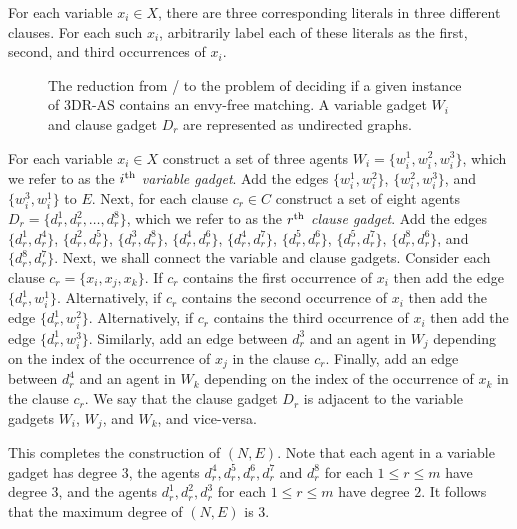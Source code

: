 For each variable $x_i \in X$, there are three corresponding literals in three different clauses. For each such $x_i$, arbitrarily label each of these literals as the first, second, and third occurrences of $x_i$.
\begin{figure}
    \centering
    
    \caption[The reduction from \porschenxsatvariant/ to the problem of deciding if a given instance of 3DR-AS contains an envy-free matching]{The reduction from \porschenxsatvariant/ to the problem of deciding if a given instance of 3DR-AS contains an envy-free matching. A variable gadget $W_i$ and clause gadget $D_r$ are represented as undirected graphs.}
    \label{fig:threed_efr_as_regular_envy_free_reduction}
\end{figure}
For each variable $x_i \in X$ construct a set of three agents $W_i = \{ w_i^1, w_i^2, w_i^3 \}$, which we refer to as the \emph{$i\textsuperscript{th}$ variable gadget}. Add the edges $\{ w_i^1, w_i^2 \}$, $\{ w_i^2, w_i^3 \}$, and $\{ w_i^3, w_i^1 \}$ to $E$. Next, for each clause $c_r\in C$ construct a set of eight agents $D_r = \{ d_r^1, d_r^2, \dots, d_r^8 \}$, which we refer to as the \emph{$r\textsuperscript{th}$ clause gadget}. Add the edges $\{ d_r^1, d_r^4 \}$, $\{ d_r^2, d_r^5 \}$, $\{ d_r^3, d_r^8 \}$, $\{ d_r^4, d_r^6 \}$, $\{ d_r^4, d_r^7 \}$, $\{ d_r^5, d_r^6 \}$, $\{ d_r^5, d_r^7 \}$, $\{ d_r^8, d_r^6 \}$, and $\{ d_r^8, d_r^7 \}$. Next, we shall connect the variable and clause gadgets. Consider each clause $c_r = \{ x_i, x_j, x_k \}$. If $c_r$ contains the first occurrence of $x_i$ then add the edge $\{ d_r^1, w_i^1 \}$. Alternatively, if $c_r$ contains the second occurrence of $x_i$ then add the edge $\{ d_r^1, w_i^2 \}$. Alternatively, if $c_r$ contains the third occurrence of $x_i$ then add the edge $\{ d_r^1, w_i^3 \}$. Similarly, add an edge between $d_r^3$ and an agent in $W_j$ depending on the index of the occurrence of $x_j$ in the clause $c_r$. Finally, add an edge between $d_r^4$ and an agent in $W_k$ depending on the index of the occurrence of $x_k$ in the clause $c_r$. We say that the clause gadget $D_r$ is adjacent to the variable gadgets $W_i$, $W_j$, and $W_k$, and vice-versa.

This completes the construction of $(N, E)$. Note that each agent in a variable gadget has degree $3$, the agents $d_r^4, d_r^5, d_r^6, d_r^7$ and $d_r^8$ for each $1 \leq r \leq m$ have degree $3$, and the agents $d_r^1, d_r^2, d_r^3$ for each $1 \leq r \leq m$ have degree $2$. It follows that the maximum degree of $(N, E)$ is $3$. 

